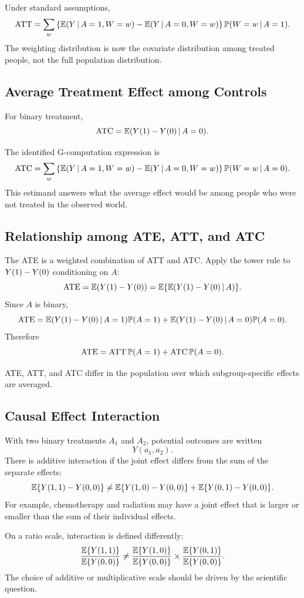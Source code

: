 Under standard assumptions,
\[
\operatorname{ATT}
=
\sum_w
\left\{
\mathbb{E}(Y\,\vert\, A=1,W=w)-\mathbb{E}(Y\,\vert\, A=0,W=w)
\right\}
\mathbb{P}(W=w\,\vert\, A=1).
\]
The weighting distribution is now the covariate distribution among treated people, not the full population distribution.

\subsection{Average Treatment Effect among Controls}

\begin{definition}
For binary treatment,
\[
\operatorname{ATC}=\mathbb{E}(Y(1)-Y(0)\,\vert\, A=0).
\]
\end{definition}

The identified G-computation expression is
\[
\operatorname{ATC}
=
\sum_w
\left\{
\mathbb{E}(Y\,\vert\, A=1,W=w)-\mathbb{E}(Y\,\vert\, A=0,W=w)
\right\}
\mathbb{P}(W=w\,\vert\, A=0).
\]
This estimand answers what the average effect would be among people who were not treated in the observed world.

\subsection{Relationship among ATE, ATT, and ATC}

The ATE is a weighted combination of ATT and ATC. Apply the tower rule to $Y(1)-Y(0)$ conditioning on $A$:
\[
\operatorname{ATE}
=
\mathbb{E}(Y(1)-Y(0))
=
\mathbb{E}\{\mathbb{E}(Y(1)-Y(0)\,\vert\, A)\}.
\]
Since $A$ is binary,
\[
\operatorname{ATE}
=
\mathbb{E}(Y(1)-Y(0)\,\vert\, A=1)\mathbb{P}(A=1)
+
\mathbb{E}(Y(1)-Y(0)\,\vert\, A=0)\mathbb{P}(A=0).
\]
Therefore
\[
\operatorname{ATE}=\operatorname{ATT}\mathbb{P}(A=1)+\operatorname{ATC}\mathbb{P}(A=0).
\]

\begin{keyidea}
ATE, ATT, and ATC differ in the population over which subgroup-specific effects are averaged.
\end{keyidea}

\subsection{Causal Effect Interaction}

With two binary treatments $A_1$ and $A_2$, potential outcomes are written
\[
Y(a_1,a_2).
\]
There is additive interaction if the joint effect differs from the sum of the separate effects:
\[
\mathbb{E}\{Y(1,1)-Y(0,0)\}
\ne
\mathbb{E}\{Y(1,0)-Y(0,0)\}
+
\mathbb{E}\{Y(0,1)-Y(0,0)\}.
\]
For example, chemotherapy and radiation may have a joint effect that is larger or smaller than the sum of their individual effects.

On a ratio scale, interaction is defined differently:
\[
\frac{\mathbb{E}\{Y(1,1)\}}{\mathbb{E}\{Y(0,0)\}}
\ne
\frac{\mathbb{E}\{Y(1,0)\}}{\mathbb{E}\{Y(0,0)\}}
\times
\frac{\mathbb{E}\{Y(0,1)\}}{\mathbb{E}\{Y(0,0)\}}.
\]
The choice of additive or multiplicative scale should be driven by the scientific question.
